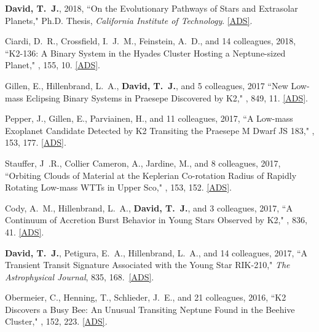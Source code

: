 \item {\bf {David}, T.~J.}, 2018, ``{On the Evolutionary Pathways of Stars and Extrasolar Planets}," Ph.D. Thesis, \textit{California Institute of Technology}. \href{https://ui.adsabs.harvard.edu/abs/2018PhDT........38D/abstract}{[ADS]}.

\item {Ciardi}, D.~R., {Crossfield}, I.~J.~M., {Feinstein}, A.~D., and 14 colleagues, 2018, ``{K2-136: A Binary System in the Hyades Cluster Hosting a Neptune-sized Planet}," \aj, 155, 10. \href{https://ui.adsabs.harvard.edu/#abs/2018AJ....155...10C}{[ADS]}.

\item {Gillen}, E., {Hillenbrand}, L.~A., {\bf {David}, T.~J.}, and 5 colleagues, 2017 ``{New Low-mass Eclipsing Binary Systems in Praesepe Discovered by K2}," \apj, 849, 11. \href{https://ui.adsabs.harvard.edu/#abs/2017ApJ...849...11G}{[ADS]}.

\item {Pepper}, J., {Gillen}, E., {Parviainen}, H., and 11 colleagues, 2017, ``{A Low-mass Exoplanet Candidate Detected by K2 Transiting the Praesepe M Dwarf JS 183}," \aj, 153, 177. \href{https://ui.adsabs.harvard.edu/#abs/2017AJ....153..177P}{[ADS]}.

\item {Stauffer}, J~.R., {Collier Cameron}, A., {Jardine}, M., and 8 colleagues, 2017, ``{Orbiting Clouds of Material at the Keplerian Co-rotation Radius of Rapidly Rotating Low-mass WTTs in Upper Sco}," \aj, 153, 152. \href{https://ui.adsabs.harvard.edu/#abs/2017AJ....153..152S}{[ADS]}.

\item {Cody}, A.~M., {Hillenbrand}, L.~A., {\bf {David}, T.~J.}, and 3 colleagues, 2017, ``{A Continuum of Accretion Burst Behavior in Young Stars Observed by K2}," \apj, 836, 41. \href{https://ui.adsabs.harvard.edu/#abs/2017ApJ...836...41C}{[ADS]}.

\item {\bf {\bf David, T.}~J.}, {Petigura}, E.~A., {Hillenbrand}, L.~A., and 14 colleagues, 2017, ``{A Transient Transit Signature Associated with the Young Star RIK-210}," \textit{The Astrophysical Journal}, 835, 168.\ \href{https://ui.adsabs.harvard.edu/#abs/2017ApJ...835..168D/}{[ADS]}. 

\item {Obermeier}, C., {Henning}, T., {Schlieder}, J.~E., and 21 colleagues, 2016, ``{K2 Discovers a Busy Bee: An Unusual Transiting Neptune Found in the Beehive Cluster}," \aj, 152, 223. \href{https://ui.adsabs.harvard.edu/#abs/2016AJ....152..223O}{[ADS]}.

